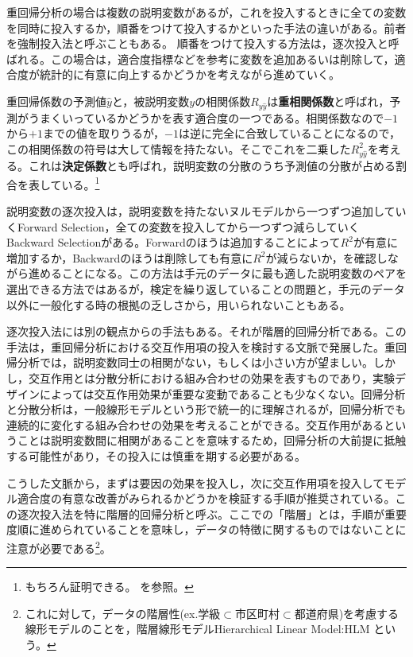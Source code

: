 \documentclass[
  a4paper,
]{ltjsbook}
\begin{document}
重回帰分析の場合は複数の説明変数があるが，これを投入するときに全ての変数を同時に投入するか，順番をつけて投入するかといった手法の違いがある。前者を強制投入法と呼ぶこともある。
順番をつけて投入する方法は，逐次投入と呼ばれる。この場合は，適合度指標などを参考に変数を追加あるいは削除して，適合度が統計的に有意に向上するかどうかを考えながら進めていく。

重回帰係数の予測値\(\hat{y}\)と，被説明変数\(y\)の相関係数\(R_{y\hat{y}}\)は\textbf{重相関係数}と呼ばれ，予測がうまくいっているかどうかを表す適合度の一つである。相関係数なので\(-1\)から\(+1\)までの値を取りうるが，\(-1\)は逆に完全に合致していることになるので，この相関係数の符号は大して情報を持たない。そこでこれを二乗した\(R_{y\hat{y}}^2\)を考える。これは\textbf{決定係数}とも呼ばれ，説明変数の分散のうち予測値の分散が占める割合を表している。\footnote{もちろん証明できる。\textcite{kosugi2018}
  を参照。}

説明変数の逐次投入は，説明変数を持たないヌルモデルから一つずつ追加していくForward
Selection，全ての変数を投入してから一つずつ減らしていくBackward
Selectionがある。Forwardのほうは追加することによって\(R^2\)が有意に増加するか，Backwardのほうは削除しても有意に\(R^2\)が減らないか，を確認しながら進めることになる。この方法は手元のデータに最も適した説明変数のペアを選出できる方法ではあるが，検定を繰り返していることの問題と，手元のデータ以外に一般化する時の根拠の乏しさから，用いられないこともある。

逐次投入法には別の観点からの手法もある。それが階層的回帰分析である。この手法は，重回帰分析における交互作用項の投入を検討する文脈で発展した。重回帰分析では，説明変数同士の相関がない，もしくは小さい方が望ましい。しかし，交互作用とは分散分析における組み合わせの効果を表すものであり，実験デザインによっては交互作用効果が重要な変動であることも少なくない。回帰分析と分散分析は，一般線形モデルという形で統一的に理解されるが，回帰分析でも連続的に変化する組み合わせの効果を考えることができる。交互作用があるということは説明変数間に相関があることを意味するため，回帰分析の大前提に抵触する可能性があり，その投入には慎重を期する必要がある。

こうした文脈から，まずは要因の効果を投入し，次に交互作用項を投入してモデル適合度の有意な改善がみられるかどうかを検証する手順が推奨されている。この逐次投入法を特に階層的回帰分析と呼ぶ。ここでの「階層」とは，手順が重要度順に進められていることを意味し，データの特徴に関するものではないことに注意が必要である\footnote{これに対して，データの階層性(ex.学級\(\subset\)市区町村\(\subset\)都道府県)を考慮する線形モデルのことを，階層線形モデルHierarchical
  Linear Model:HLM という。}。
\end{document}
